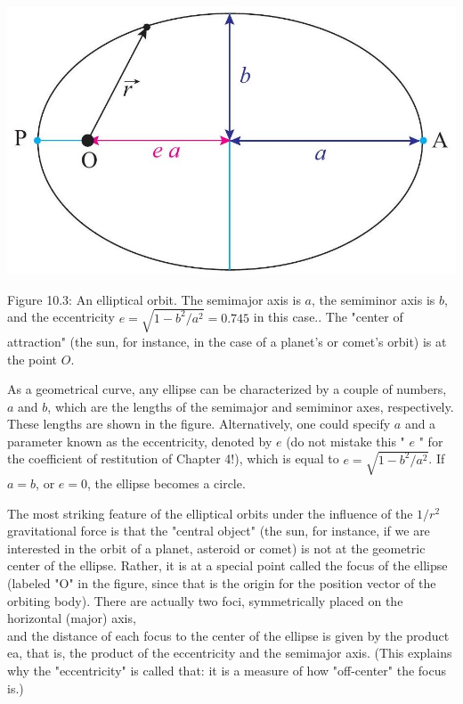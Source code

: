 \documentclass[10pt]{article}
\begin{document}
\begin{center}
\includegraphics[max width=\textwidth]{2024_09_14_9969b06773f10b6936e8g-246}
\end{center}

Figure 10.3: An elliptical orbit. The semimajor axis is $a$, the semiminor axis is $b$, and the eccentricity $e=\sqrt{1-b^{2} / a^{2}}=0.745$ in this case.. The "center of attraction" (the sun, for instance, in the case of a planet's or comet's orbit) is at the point $O$.

As a geometrical curve, any ellipse can be characterized by a couple of numbers, $a$ and $b$, which are the lengths of the semimajor and semiminor axes, respectively. These lengths are shown in the figure. Alternatively, one could specify $a$ and a parameter known as the eccentricity, denoted by $e$ (do not mistake this " $e$ " for the coefficient of restitution of Chapter 4!), which is equal to $e=\sqrt{1-b^{2} / a^{2}}$. If $a=b$, or $e=0$, the ellipse becomes a circle.

The most striking feature of the elliptical orbits under the influence of the $1 / r^{2}$ gravitational force is that the "central object" (the sun, for instance, if we are interested in the orbit of a planet, asteroid or comet) is not at the geometric center of the ellipse. Rather, it is at a special point called the focus of the ellipse (labeled "O" in the figure, since that is the origin for the position vector of the orbiting body). There are actually two foci, symmetrically placed on the horizontal (major) axis,\\
and the distance of each focus to the center of the ellipse is given by the product ea, that is, the product of the eccentricity and the semimajor axis. (This explains why the "eccentricity" is called that: it is a measure of how "off-center" the focus is.)
\end{document}
